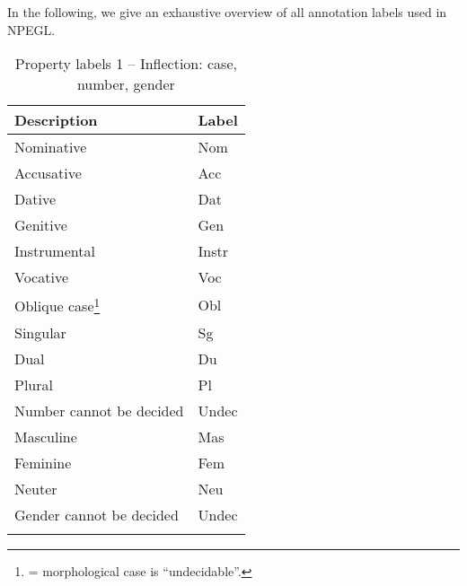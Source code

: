 \documentclass[output=paper,colorlinks,citecolor=brown]{langscibook}
\begin{document}
In the following, we give an exhaustive overview of all annotation labels used in NPEGL.


\begin{table}
    \small
    \begin{tabular}{ll}
    \lsptoprule    
        Description			&	Label					  \\\midrule    
     	Nominative 						&	{Nom}					 \\  
     	Accusative 						&	{Acc}				 	 \\  
     	Dative	 						&	{Dat}		 	 \\  
     	 Genitive						&	{Gen}		 	 \\  
     	 Instrumental					&	{Instr}		   \\  
     	 Vocative						&	{Voc}	   \\  
     	 Oblique case\footnote{= morphological case is ``undecidable''.} &	{Obl} \\\addlinespace
     	 Singular						&	{Sg}		  	 \\  
     	 Dual							&	{Du}	  	 \\  
     	 Plural							&	{Pl}	  	 \\   
     	 Number cannot be decided  		&	{Undec}		 	 \\   
     	 Masculine						&	{Mas}	    \\\addlinespace
     	Feminine 						&	{Fem} 	 \\  
     	 Neuter				    		&	{Neu}		   \\  
     	 Gender cannot be decided  		&	{Undec}		  	 \\\lspbottomrule
\end{tabular}  
\caption{Property labels  1 -- Inflection: case, number, gender\label{ixpINFL}}
\end{table}
\end{document}
